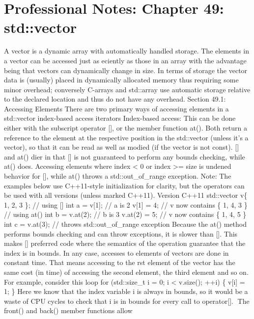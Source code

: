 \hypertarget{professional-notes-chapter-49-stdvector-1}{%
\chapter{Professional Notes: Chapter 49:
std::vector}\label{professional-notes-chapter-49-stdvector-1}}

A vector is a dynamic array with automatically handled storage. The
elements in a vector can be accessed just as eciently as those in an
array with the advantage being that vectors can dynamically change in
size. In terms of storage the vector data is (usually) placed in
dynamically allocated memory thus requiring some minor overhead;
conversely C-arrays and std::array use automatic storage relative to the
declared location and thus do not have any overhead. Section 49.1:
Accessing Elements There are two primary ways of accessing elements in a
std::vector index-based access iterators Index-based access: This can be
done either with the subscript operator {[}{]}, or the member function
at(). Both return a reference to the element at the respective position
in the std::vector (unless it's a vector), so that it can be read as
well as modied (if the vector is not const). {[}{]} and at() dier in
that {[}{]} is not guaranteed to perform any bounds checking, while at()
does. Accessing elements where index \textless{} 0 or index
\textgreater= size is undened behavior for {[}{]}, while at() throws a
std::out\_of\_range exception. Note: The examples below use C++11-style
initialization for clarity, but the operators can be used with all
versions (unless marked C++11). Version C++11 std::vector v\{ 1, 2, 3
\}; // using {[}{]} int a = v{[}1{]}; // a is 2 v{[}1{]} = 4; // v now
contains \{ 1, 4, 3 \} // using at() int b = v.at(2); // b is 3 v.at(2)
= 5; // v now contains \{ 1, 4, 5 \} int c = v.at(3); // throws
std::out\_of\_range exception Because the at() method performs bounds
checking and can throw exceptions, it is slower than {[}{]}. This makes
{[}{]} preferred code where the semantics of the operation guarantee
that the index is in bounds. In any case, accesses to elements of
vectors are done in constant time. That means accessing to the rst
element of the vector has the same cost (in time) of accessing the
second element, the third element and so on. For example, consider this
loop for (std::size\_t i = 0; i \textless{} v.size(); ++i) \{ v{[}i{]} =
1; \} Here we know that the index variable i is always in bounds, so it
would be a waste of CPU cycles to check that i is in bounds for every
call to operator{[}{]}. The front() and back() member functions allow
